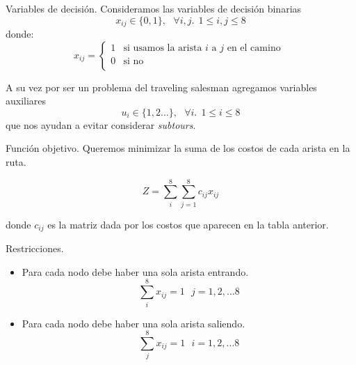 \documentclass{beamer}
\begin{document}
\begin{frame}[fragile]{Variables de decisión.}
  Consideramos las variables de decisión binarias 
  \[
    x_{ij} \in \{0,1\}, \ \ \ \forall i,j. \ \  1 \le i,j \le 8
  \]
  donde: 
  \[
  x_{ij} = 
    \begin{cases}
      1 & \text{si usamos la arista $i$ a $j$ en el camino } \\
      0 & \text{si no} \\
    \end{cases}
  \]
  
  \pause 

  A su vez por ser un problema del traveling salesman agregamos variables auxiliares
  \[
    u_{i} \in \{ 1,2 \dots \}, \ \ \ \forall i. \ \  1 \le i \le 8
  \]
  que nos ayudan a evitar considerar \emph{subtours}.
\end{frame}

\begin{frame}[fragile]{Función objetivo.}
  Queremos minimizar la suma de los costos de cada arista en la ruta.

  \[
    Z = \sum_{i}^{8}\sum_{j=1}^{8} c_{ij}x_{ij}
  \]

  donde $c_{ij}$ es la matriz dada por los costos que aparecen en la tabla anterior.
\end{frame}

\begin{frame}[fragile]{Restricciones.}
  \begin{itemize}
    \item Para cada nodo debe haber una sola arista entrando.
    \pause 
      \[
        \sum_{i}^{8} x_{ij} = 1 \ \ \ j = 1,2, \dots 8
      \]

    \item Para cada nodo debe haber una sola arista saliendo.
    \pause 
      \[
        \sum_{j}^{8} x_{ij} = 1 \ \ \ i = 1,2, \dots 8
      \]
  \end{itemize}
\end{frame}
\end{document}
